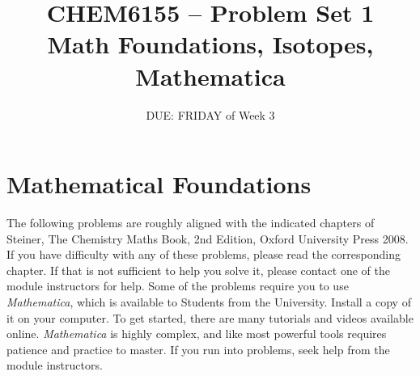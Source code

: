 \documentclass{chem6155problemset}
\title{CHEM6155 -- Problem Set 1\\Math Foundations, Isotopes, Mathematica}
\date{DUE: FRIDAY of Week 3}
\begin{document}
\maketitle

\section{Mathematical Foundations}
The following problems are roughly aligned with the indicated chapters of Steiner, The Chemistry
Maths Book, 2nd Edition, Oxford University Press 2008. If you have difficulty with any
of these problems, please read the corresponding chapter. If that is not sufficient
to help you solve it, please contact one of the module instructors for help. Some of the problems
require you to use \emph{Mathematica}, which is available to Students from the University.
Install a copy of it on your computer. To get started, there are many tutorials and videos
available online. \emph{Mathematica} is highly complex, and like most powerful tools requires
patience and practice to master. If you run into problems, seek help from the module instructors.
\end{document}
